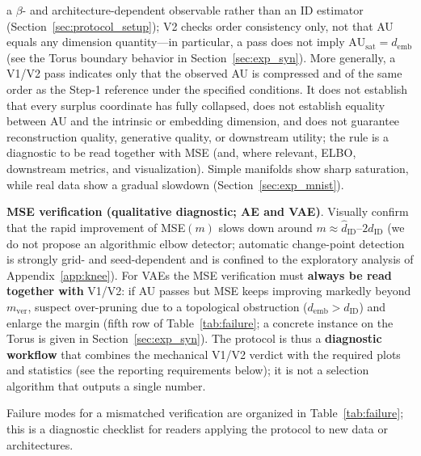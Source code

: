 \documentclass[make,article,submit,pdftex,moreauthors]{Definitions/mdpi}
\newcommand{\dID}{d_{\mathrm{ID}}}
\newcommand{\hatdID}{\hat{d}_{\mathrm{ID}}}
\newcommand{\AUsat}{\mathrm{AU}_{\mathrm{sat}}}
\newcommand{\demb}{d_{\mathrm{emb}}}
\begin{document}
a $\beta$- and architecture-dependent observable rather than an ID
estimator (Section~\ref{sec:protocol_setup}); V2 checks order consistency
only, not that AU equals any dimension quantity---in particular, a pass
does not imply $\AUsat = \demb$ (see the Torus boundary behavior in
Section~\ref{sec:exp_syn}).
More generally, a V1/V2 pass indicates only that the observed AU is
compressed and of the same order as the Step-1 reference under the
specified conditions.
It does not establish that every surplus coordinate has fully collapsed,
does not establish equality between AU and the intrinsic or embedding
dimension, and does not guarantee reconstruction quality, generative
quality, or downstream utility; the rule is a diagnostic to be read
together with MSE (and, where relevant, ELBO, downstream metrics, and
visualization).
Simple manifolds show sharp saturation, while real data show a gradual
slowdown (Section~\ref{sec:exp_mnist}).

\textbf{MSE verification (qualitative diagnostic; AE and VAE)}.
Visually confirm that the rapid improvement of MSE$(m)$ slows down
around $m \approx \hatdID$--$2\hatdID$ (we do not propose an
algorithmic elbow detector; automatic change-point detection is
strongly grid- and seed-dependent and is confined to the exploratory
analysis of Appendix~\ref{app:knee}).
For VAEs the MSE verification must \textbf{always be read together with}
V1/V2: if AU passes but MSE keeps improving markedly beyond
$m_{\mathrm{ver}}$, suspect over-pruning due to a topological obstruction
($\demb > \dID$) and enlarge the margin (fifth row of
Table~\ref{tab:failure}; a concrete instance on the Torus is given in
Section~\ref{sec:exp_syn}).
The protocol is thus a \textbf{diagnostic workflow} that combines the
mechanical V1/V2 verdict with the required plots and statistics (see the
reporting requirements below); it is not a selection algorithm that outputs
a single number.

Failure modes for a mismatched verification are organized in
Table~\ref{tab:failure}; this is a diagnostic checklist for readers applying
the protocol to new data or architectures.
\end{document}
